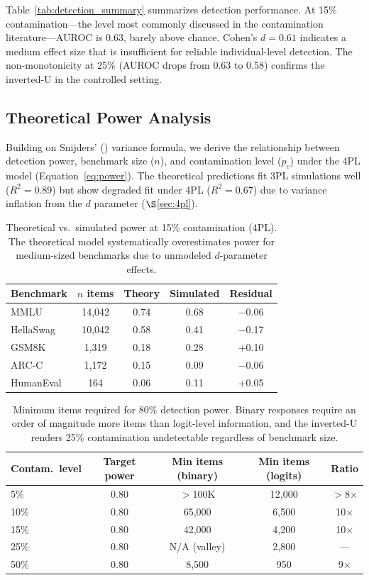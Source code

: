 \documentclass[11pt,a4paper]{article}
\begin{document}
Table~\ref{tab:detection_summary} summarizes detection performance. At 15\% contamination---the level most commonly discussed in the contamination literature---AUROC is 0.63, barely above chance. Cohen's $d = 0.61$ indicates a medium effect size that is insufficient for reliable individual-level detection. The non-monotonicity at 25\% (AUROC drops from 0.63 to 0.58) confirms the inverted-U in the controlled setting.

\subsection{Theoretical Power Analysis}
\label{sec:theory}

Building on Snijders' (\citeyear{snijders2001}) variance formula, we derive the relationship between detection power, benchmark size ($n$), and contamination level ($p_c$) under the 4PL model (Equation~\ref{eq:power}). The theoretical predictions fit 3PL simulations well ($R^2 = 0.89$) but show degraded fit under 4PL ($R^2 = 0.67$) due to variance inflation from the $d$ parameter ($\S$\ref{sec:4pl}).

\begin{table}[t]
\centering
\caption{Theoretical vs.\ simulated power at 15\% contamination (4PL). The theoretical model systematically overestimates power for medium-sized benchmarks due to unmodeled $d$-parameter effects.}
\label{tab:theory_vs_sim}
\small
\begin{tabular}{@{}lcccc@{}}
\toprule
Benchmark & $n$ items & Theory & Simulated & Residual \\
\midrule
MMLU & 14{,}042 & 0.74 & 0.68 & $-$0.06 \\
HellaSwag & 10{,}042 & 0.58 & 0.41 & $-$0.17 \\
GSM8K & 1{,}319 & 0.18 & 0.28 & $+$0.10 \\
ARC-C & 1{,}172 & 0.15 & 0.09 & $-$0.06 \\
HumanEval & 164 & 0.06 & 0.11 & $+$0.05 \\
\bottomrule
\end{tabular}
\end{table}

\begin{table}[t]
\centering
\caption{Minimum items required for 80\% detection power. Binary responses require an order of magnitude more items than logit-level information, and the inverted-U renders 25\% contamination undetectable regardless of benchmark size.}
\label{tab:min_items}
\small
\begin{tabular}{@{}lcccc@{}}
\toprule
Contam.\ level & Target power & Min items (binary) & Min items (logits) & Ratio \\
\midrule
5\% & 0.80 & $>$100K & 12{,}000 & $>$8$\times$ \\
10\% & 0.80 & 65{,}000 & 6{,}500 & 10$\times$ \\
15\% & 0.80 & 42{,}000 & 4{,}200 & 10$\times$ \\
25\% & 0.80 & N/A (valley) & 2{,}800 & --- \\
50\% & 0.80 & 8{,}500 & 950 & 9$\times$ \\
\bottomrule
\end{tabular}
\end{table}
\end{document}
